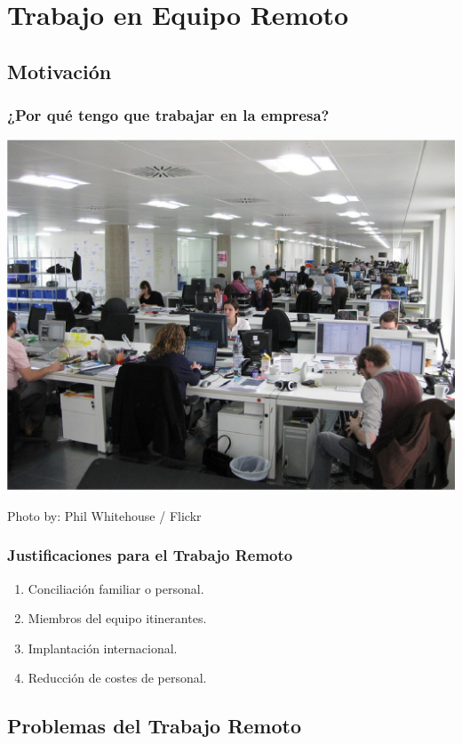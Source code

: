 \documentclass[a4paper,t,xcolor=pst,dvips]{beamer}
\begin{document}
\section{Trabajo en Equipo Remoto}

\subsection{Motivación}

\begin{frame}[c]
	\frametitle{¿Por qué tengo que trabajar en la empresa?}
	\begin{center}
		\includegraphics[width=0.75\linewidth,keepaspectratio=true]{images/motivacion01.eps}
	\end{center}
	\begin{flushright}
		\tiny{Photo by: Phil Whitehouse / Flickr}
	\end{flushright}
\end{frame}

\begin{frame}[c]
	\frametitle{Justificaciones para el Trabajo Remoto}
	\begin{enumerate}[<+->]
        \item Conciliación familiar o personal.
        \item Miembros del equipo itinerantes.
        \item Implantación internacional.
        \item Reducción de costes de personal.
	\end{enumerate}
\end{frame}

\subsection{Problemas del Trabajo Remoto}
\end{document}
